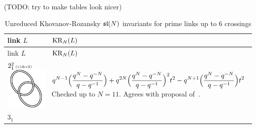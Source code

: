 \documentclass{compositio}
\theoremstyle{definition}
\numberwithin{equation}{section}
\begin{document}
(TODO: try to make tables look nicer)

\newpage

{\footnotesize 
\begin{longtable}{p{}|p{}} 
\caption{Unreduced Khovanov-Rozansky $\mathfrak{sl}(N)$ invariants for prime links up to 6 crossings}
\label{unreducedKR}
\\
link $L$ & $\operatorname{KR}_{N}(L)$ \\
\hline\hline
\endfirsthead
link $L$ & $\operatorname{KR}_{N}(L)$ \\
\hline\hline
\endhead
\hline\hline
\endfoot
$2_{1}^2\,\text{{\tiny (v1\&v2)}}$ 
\includegraphics[scale=0.07,angle=0]{link2_1_2.pdf} 
& 
$
\displaystyle{%
q^{N-1} \Big(\frac{q^N-q^{-N}}{q-q^{-1}}\Big) + q^{2N} \Big(\frac{q^N-q^{-N}}{q-q^{-1}}\Big)^2 t^2 - q^{N+1} \Big(\frac{q^N-q^{-N}}{q-q^{-1}}\Big) t^2
}
$
\newline\newline\newline\newline
Checked up to $N=11$. Agrees with proposal of~\cite{gikv0705.1368}.
\\
\hline
$3_{1}$ 

\end{longtable}}
\end{document}
